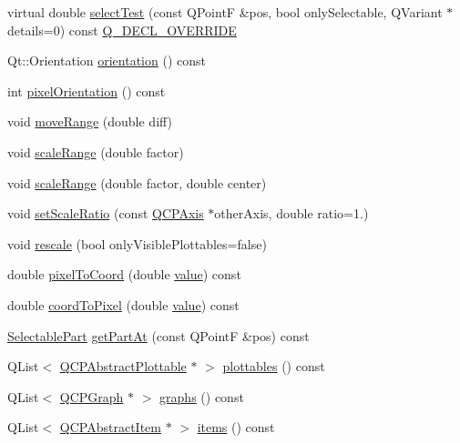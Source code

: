 \begin{DoxyCompactItemize}
\item 
virtual double \mbox{\hyperlink{class_q_c_p_axis_a63b7103c57fe9acfbce164334ea837f8}{select\+Test}} (const Q\+PointF \&pos, bool only\+Selectable, Q\+Variant $\ast$details=0) const \mbox{\hyperlink{qcustomplot_8h_a42cc5eaeb25b85f8b52d2a4b94c56f55}{Q\+\_\+\+D\+E\+C\+L\+\_\+\+O\+V\+E\+R\+R\+I\+DE}}
\item 
Qt\+::\+Orientation \mbox{\hyperlink{class_q_c_p_axis_ab988ef4538e2655bb77bd138189cd42e}{orientation}} () const
\item 
int \mbox{\hyperlink{class_q_c_p_axis_a45c45bed7e5666683b8d56afa66fa51f}{pixel\+Orientation}} () const
\item 
void \mbox{\hyperlink{class_q_c_p_axis_a18f3a68f2b691af1fd34b6593c886630}{move\+Range}} (double diff)
\item 
void \mbox{\hyperlink{class_q_c_p_axis_a31d18ddf3a4f21ceb077db8ae5b69856}{scale\+Range}} (double factor)
\item 
void \mbox{\hyperlink{class_q_c_p_axis_a7072ff96fe690148f1bbcdb4f773ea1c}{scale\+Range}} (double factor, double center)
\item 
void \mbox{\hyperlink{class_q_c_p_axis_af4bbd446dcaee5a83ac30ce9bcd6e125}{set\+Scale\+Ratio}} (const \mbox{\hyperlink{class_q_c_p_axis}{Q\+C\+P\+Axis}} $\ast$other\+Axis, double ratio=1.)
\item 
void \mbox{\hyperlink{class_q_c_p_axis_a499345f02ebce4b23d8ccec96e58daa9}{rescale}} (bool only\+Visible\+Plottables=false)
\item 
double \mbox{\hyperlink{class_q_c_p_axis_a536ef8f624cac59b6b6fdcb495723c57}{pixel\+To\+Coord}} (double \mbox{\hyperlink{diffusion_8cpp_a4b41795815d9f3d03abfc739e666d5da}{value}}) const
\item 
double \mbox{\hyperlink{class_q_c_p_axis_af15d1b3a7f7e9b53d759d3ccff1fe4b4}{coord\+To\+Pixel}} (double \mbox{\hyperlink{diffusion_8cpp_a4b41795815d9f3d03abfc739e666d5da}{value}}) const
\item 
\mbox{\hyperlink{class_q_c_p_axis_abee4c7a54c468b1385dfce2c898b115f}{Selectable\+Part}} \mbox{\hyperlink{class_q_c_p_axis_a22ab2d71d7341b9b3974c0dd10619af2}{get\+Part\+At}} (const Q\+PointF \&pos) const
\item 
Q\+List$<$ \mbox{\hyperlink{class_q_c_p_abstract_plottable}{Q\+C\+P\+Abstract\+Plottable}} $\ast$ $>$ \mbox{\hyperlink{class_q_c_p_axis_ac5e0f6f65c75efb5fd32275d6e4ef0d6}{plottables}} () const
\item 
Q\+List$<$ \mbox{\hyperlink{class_q_c_p_graph}{Q\+C\+P\+Graph}} $\ast$ $>$ \mbox{\hyperlink{class_q_c_p_axis_ad590c0da223697a2727f97a520870fec}{graphs}} () const
\item 
Q\+List$<$ \mbox{\hyperlink{class_q_c_p_abstract_item}{Q\+C\+P\+Abstract\+Item}} $\ast$ $>$ \mbox{\hyperlink{class_q_c_p_axis_a42761bc68e2f3a9f68549d45b73f705b}{items}} () const
\end{DoxyCompactItemize}
